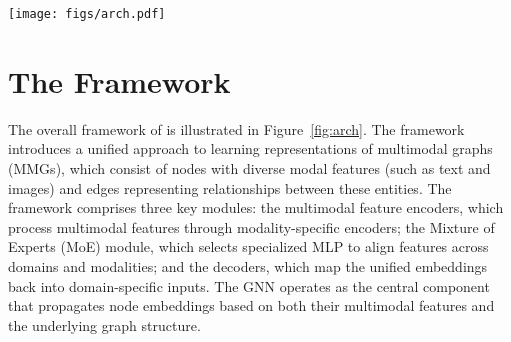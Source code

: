 \begin{figure*}[t]
    \centering
    \texttt{[image: figs/arch.pdf]}
    \caption{\textbf{Overview of the \model framework.} In pre-training, 
    1) UniGraph2 uses frozen Modality-Specific Encoders to encode raw multimodal data (e.g., text, images) into vector node features. Then, a portion of these node features is randomly masked. 
    2) Considering the diversity of node features across different modalities and graph domains, a Mixture of Experts (MoE) network is used to align the different node features, allowing the model to assign each node to one or more experts based on its domain and modality. 
    3) The aligned node features are fed into a GNN for learning and projected into a unified embedding space.
    4) The decoding involves two objectives: a. Each graph domain corresponds to a specific decoder for reconstructing the node features. b. A shared shortest path distance decoder is used to reconstruct the graph structures.
    }
    \vspace{-3mm}
    \label{fig:arch}
\end{figure*}

\section{The \model Framework}
The overall framework of \model is illustrated in Figure~\ref{fig:arch}.
The \model framework introduces a unified approach to learning representations of multimodal graphs (MMGs), which consist of nodes with diverse modal features (such as text and images) and edges representing relationships between these entities. 
The framework comprises three key modules: the multimodal feature encoders, which process multimodal features through modality-specific encoders; the Mixture of Experts (MoE) module, which selects specialized MLP to align features across domains and modalities; and the decoders, which map the unified embeddings back into domain-specific inputs. 
The GNN operates as the central component that propagates node embeddings based on both their multimodal features and the underlying graph structure.


